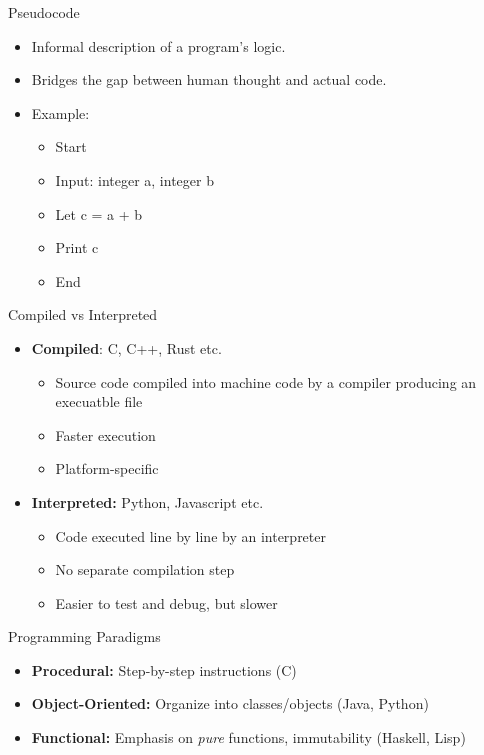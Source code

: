 \documentclass[12pt, aspectratio=169]{beamer}
\begin{document}
    \begin{frame}{Pseudocode}
        \begin{itemize}
            \item Informal description of a program’s logic.
            \item Bridges the gap between human thought and actual code.
            \item Example:
            \begin{itemize}
                \item Start
                \item Input: integer a, integer b
                \item Let c = a + b
                \item Print c
                \item End
            \end{itemize}
        \end{itemize}
    \end{frame}


    \begin{frame}{Compiled vs Interpreted}
        \begin{itemize}
            \item \textbf{Compiled}: C, C++, Rust etc.
            \begin{itemize}
                \item Source code compiled into machine code by a compiler producing an execuatble file
                \item Faster execution
                \item Platform-specific
            \end{itemize}
            \item \textbf{Interpreted:} Python, Javascript etc.
            \begin{itemize}
                \item Code executed line by line by an interpreter
                \item No separate compilation step
                \item Easier to test and debug, but slower
            \end{itemize}
        \end{itemize}
    \end{frame}


    \begin{frame}{Programming Paradigms}
        \begin{itemize}
            \item \textbf{Procedural:} Step-by-step instructions (C)
            \item \textbf{Object-Oriented:} Organize into classes/objects (Java, Python)
            \item \textbf{Functional:} Emphasis on \emph{pure} functions, immutability (Haskell, Lisp)
        \end{itemize}
    \end{frame}
\end{document}
